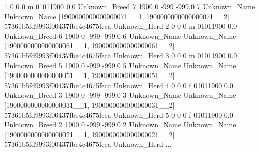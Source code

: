 \documentclass[
  letterpaper,
  DIV=11,
  numbers=noendperiod]{scrreprt}
\newenvironment{Shaded}{\begin{snugshade}}{\end{snugshade}}
\newcommand{\DecValTok}[1]{\textcolor[rgb]{0.68,0.00,0.00}{#1}}
\newcommand{\ErrorTok}[1]{\textcolor[rgb]{0.68,0.00,0.00}{#1}}
\newcommand{\FloatTok}[1]{\textcolor[rgb]{0.68,0.00,0.00}{#1}}
\newcommand{\NormalTok}[1]{\textcolor[rgb]{0.00,0.23,0.31}{#1}}
\newcommand{\OperatorTok}[1]{\textcolor[rgb]{0.37,0.37,0.37}{#1}}
\newcommand{\StringTok}[1]{\textcolor[rgb]{0.13,0.47,0.30}{#1}}
\begin{document}
\begin{Shaded}
\begin{Highlighting}[]
\DecValTok{1} \DecValTok{0} \DecValTok{0} \DecValTok{0}\NormalTok{ m }\DecValTok{0}\ErrorTok{1011900} \FloatTok{0.0}\NormalTok{ Unknown\_Breed }\DecValTok{7} \DecValTok{1900} \DecValTok{0} \OperatorTok{{-}}\DecValTok{999} \OperatorTok{{-}}\FloatTok{999.0} \DecValTok{7}\NormalTok{ Unknown\_Name Unknown\_Name [}\StringTok{\textquotesingle{}1900000000000000071\_\_1\textquotesingle{}}\NormalTok{, }\StringTok{\textquotesingle{}1900000000000000071\_\_2\textquotesingle{}}\NormalTok{] }\DecValTok{57361}\ErrorTok{b5fd9993f00437fbe4c4675feca}\NormalTok{ Unknown\_Herd}
\DecValTok{2} \DecValTok{0} \DecValTok{0} \DecValTok{0}\NormalTok{ m }\DecValTok{0}\ErrorTok{1011900} \FloatTok{0.0}\NormalTok{ Unknown\_Breed }\DecValTok{6} \DecValTok{1900} \DecValTok{0} \OperatorTok{{-}}\DecValTok{999} \OperatorTok{{-}}\FloatTok{999.0} \DecValTok{6}\NormalTok{ Unknown\_Name Unknown\_Name [}\StringTok{\textquotesingle{}1900000000000000061\_\_1\textquotesingle{}}\NormalTok{, }\StringTok{\textquotesingle{}1900000000000000061\_\_2\textquotesingle{}}\NormalTok{] }\DecValTok{57361}\ErrorTok{b5fd9993f00437fbe4c4675feca}\NormalTok{ Unknown\_Herd}
\DecValTok{3} \DecValTok{0} \DecValTok{0} \DecValTok{0}\NormalTok{ m }\DecValTok{0}\ErrorTok{1011900} \FloatTok{0.0}\NormalTok{ Unknown\_Breed }\DecValTok{5} \DecValTok{1900} \DecValTok{0} \OperatorTok{{-}}\DecValTok{999} \OperatorTok{{-}}\FloatTok{999.0} \DecValTok{5}\NormalTok{ Unknown\_Name Unknown\_Name [}\StringTok{\textquotesingle{}1900000000000000051\_\_1\textquotesingle{}}\NormalTok{, }\StringTok{\textquotesingle{}1900000000000000051\_\_2\textquotesingle{}}\NormalTok{] }\DecValTok{57361}\ErrorTok{b5fd9993f00437fbe4c4675feca}\NormalTok{ Unknown\_Herd}
\DecValTok{4} \DecValTok{0} \DecValTok{0} \DecValTok{0}\NormalTok{ f }\DecValTok{0}\ErrorTok{1011900} \FloatTok{0.0}\NormalTok{ Unknown\_Breed }\DecValTok{3} \DecValTok{1900} \DecValTok{0} \OperatorTok{{-}}\DecValTok{999} \OperatorTok{{-}}\FloatTok{999.0} \DecValTok{3}\NormalTok{ Unknown\_Name Unknown\_Name [}\StringTok{\textquotesingle{}1900000000000000031\_\_1\textquotesingle{}}\NormalTok{, }\StringTok{\textquotesingle{}1900000000000000031\_\_2\textquotesingle{}}\NormalTok{] }\DecValTok{57361}\ErrorTok{b5fd9993f00437fbe4c4675feca}\NormalTok{ Unknown\_Herd}
\DecValTok{5} \DecValTok{0} \DecValTok{0} \DecValTok{0}\NormalTok{ f }\DecValTok{0}\ErrorTok{1011900} \FloatTok{0.0}\NormalTok{ Unknown\_Breed }\DecValTok{2} \DecValTok{1900} \DecValTok{0} \OperatorTok{{-}}\DecValTok{999} \OperatorTok{{-}}\FloatTok{999.0} \DecValTok{2}\NormalTok{ Unknown\_Name Unknown\_Name [}\StringTok{\textquotesingle{}1900000000000000021\_\_1\textquotesingle{}}\NormalTok{, }\StringTok{\textquotesingle{}1900000000000000021\_\_2\textquotesingle{}}\NormalTok{] }\DecValTok{57361}\ErrorTok{b5fd9993f00437fbe4c4675feca}\NormalTok{ Unknown\_Herd}
\NormalTok{...}
\end{Highlighting}
\end{Shaded}
\end{document}
